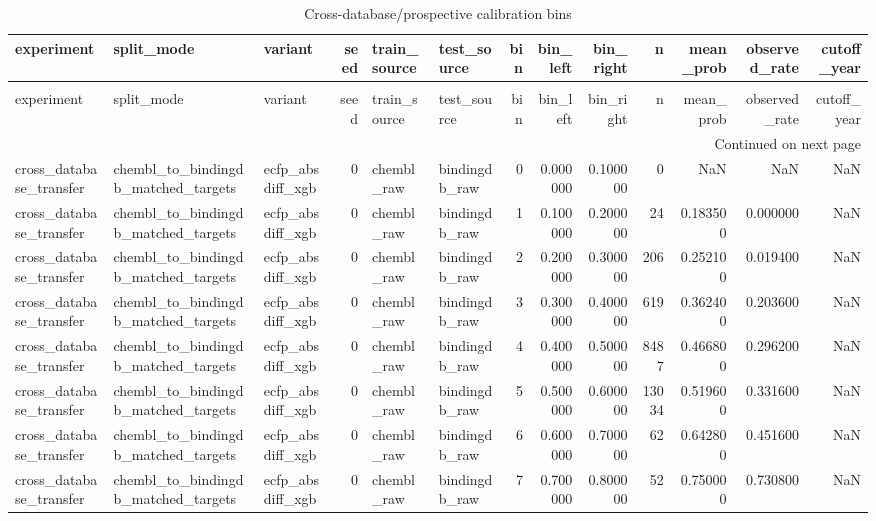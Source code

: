 \begin{longtable}{lllrllrrrrrrr}
\caption{Cross-database/prospective calibration bins} \label{tab:table_14a_p0_p1_calibration_bins} \\
\toprule
experiment & split\_mode & variant & seed & train\_source & test\_source & bin & bin\_left & bin\_right & n & mean\_prob & observed\_rate & cutoff\_year \\
\midrule
\endfirsthead
\caption[]{Cross-database/prospective calibration bins} \\
\toprule
experiment & split\_mode & variant & seed & train\_source & test\_source & bin & bin\_left & bin\_right & n & mean\_prob & observed\_rate & cutoff\_year \\
\midrule
\endhead
\midrule
\multicolumn{13}{r}{Continued on next page} \\
\midrule
\endfoot
\bottomrule
\endlastfoot
cross\_database\_transfer & chembl\_to\_bindingdb\_matched\_targets & ecfp\_absdiff\_xgb & 0 & chembl\_raw & bindingdb\_raw & 0 & 0.000000 & 0.100000 & 0 & NaN & NaN & NaN \\
cross\_database\_transfer & chembl\_to\_bindingdb\_matched\_targets & ecfp\_absdiff\_xgb & 0 & chembl\_raw & bindingdb\_raw & 1 & 0.100000 & 0.200000 & 24 & 0.183500 & 0.000000 & NaN \\
cross\_database\_transfer & chembl\_to\_bindingdb\_matched\_targets & ecfp\_absdiff\_xgb & 0 & chembl\_raw & bindingdb\_raw & 2 & 0.200000 & 0.300000 & 206 & 0.252100 & 0.019400 & NaN \\
cross\_database\_transfer & chembl\_to\_bindingdb\_matched\_targets & ecfp\_absdiff\_xgb & 0 & chembl\_raw & bindingdb\_raw & 3 & 0.300000 & 0.400000 & 619 & 0.362400 & 0.203600 & NaN \\
cross\_database\_transfer & chembl\_to\_bindingdb\_matched\_targets & ecfp\_absdiff\_xgb & 0 & chembl\_raw & bindingdb\_raw & 4 & 0.400000 & 0.500000 & 8487 & 0.466800 & 0.296200 & NaN \\
cross\_database\_transfer & chembl\_to\_bindingdb\_matched\_targets & ecfp\_absdiff\_xgb & 0 & chembl\_raw & bindingdb\_raw & 5 & 0.500000 & 0.600000 & 13034 & 0.519600 & 0.331600 & NaN \\
cross\_database\_transfer & chembl\_to\_bindingdb\_matched\_targets & ecfp\_absdiff\_xgb & 0 & chembl\_raw & bindingdb\_raw & 6 & 0.600000 & 0.700000 & 62 & 0.642800 & 0.451600 & NaN \\
cross\_database\_transfer & chembl\_to\_bindingdb\_matched\_targets & ecfp\_absdiff\_xgb & 0 & chembl\_raw & bindingdb\_raw & 7 & 0.700000 & 0.800000 & 52 & 0.750000 & 0.730800 & NaN \\

\end{longtable}
